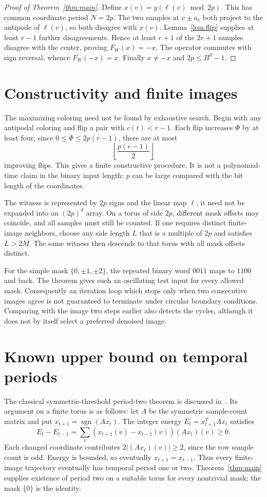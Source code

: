\documentclass[11pt]{article}
\newcommand{\sgn}{\operatorname{sgn}}
\begin{document}
\begin{proof}[Proof of Theorem~\ref{thm:main}]
Define $x(v)=y(\ell(v)\bmod 2p)$. This has common coordinate period
$N=2p$. The two samples at $v\pm a_r$ both project to the antipode of
$\ell(v)$, so both disagree with $x(v)$. Lemma~\ref{lem:flip} supplies at
least $r-1$ further disagreements. Hence at least $r+1$ of the $2r+1$
samples disagree with the center, proving $F_W(x)=-x$.
The operator commutes with sign reversal, whence $F_W(-x)=x$.
Finally $x\ne-x$ and $2p\le B^d-1$.
\end{proof}

\section{Constructivity and finite images}
The maximizing coloring need not be found by exhaustive search. Begin with
any antipodal coloring and flip a pair with $c(t)<r-1$. Each flip increases
$\Phi$ by at least four; since $0\le\Phi\le2p(r-1)$, there are at most
\[
                   \left\lfloor\frac{p(r-1)}2\right\rfloor
\]
improving flips. This gives a finite constructive procedure. It is not a
polynomial-time claim in the binary input length: $p$ can be large compared
with the bit length of the coordinates.

The witness is represented by $2p$ signs and the linear map $\ell$; it need
not be expanded into an $(2p)^d$ array. On a torus of side $2p$, different
mask offsets may coincide, and all samples must still be counted. If one
requires distinct finite-image neighbors, choose any side length $L$ that
is a multiple of $2p$ and satisfies $L>2M$. The same witness then descends
to that torus with all mask offsets distinct.

For the simple mask $\{0,\pm1,\pm2\}$, the repeated binary word $0011$
maps to $1100$ and back. The theorem gives such an oscillating test input
for every allowed mask. Consequently an iteration loop which stops only
when two consecutive images agree is not guaranteed to terminate under
circular boundary conditions. Comparing with the image two steps earlier
also detects the cycles, although it does not by itself select a preferred
denoised image.

\section{Known upper bound on temporal periods}
The classical symmetric-threshold period-two theorem is discussed
in~\cite{goles}. Its argument on a finite torus is as follows:
let $A$ be the symmetric sample-count matrix and put $x_{t+1}=\sgn(Ax_t)$.
The integer energy $E_t=x_{t+1}^{T}Ax_t$ satisfies
\[
 E_t-E_{t-1}
 =\sum_v (x_{t+1}(v)-x_{t-1}(v))(Ax_t)(v)\ge0.
\]
Each changed coordinate contributes $2|(Ax_t)(v)|\ge2$, since the row
sample count is odd. Energy is bounded, so eventually $x_{t+1}=x_{t-1}$.
Thus every finite-image trajectory eventually has temporal period one or
two. Theorem~\ref{thm:main} supplies existence of period two on a suitable
torus for every nontrivial mask; the mask $\{0\}$ is the identity.
\end{document}
